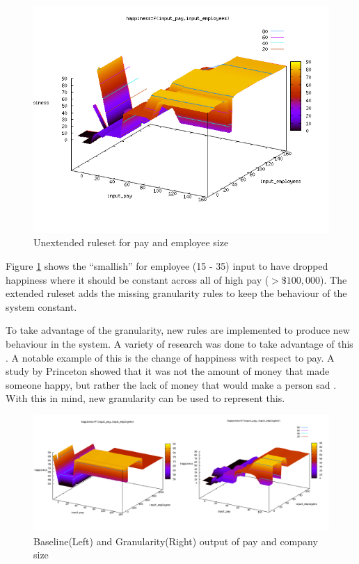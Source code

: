 \documentclass[12pt,fleqn,reqno,letterpaper]{article}
\begin{document}
\begin{figure}[H]
  \centering
  \includegraphics[scale=0.5,natwidth=650,natheight=501]{fig/extend_gran.png}
  \caption{Unextended ruleset for pay and employee size}
  \label{fig:EXTEND-GRAN}
\end{figure}
Figure \ref{fig:EXTEND-GRAN} shows the “smallish” for employee (15 - 35) input to have dropped happiness where it should be constant across all of high pay ($>\$100,000$).  The extended ruleset adds the missing granularity rules to keep the behaviour of the system constant.

To take advantage of the granularity, new rules are implemented to produce new behaviour in the system.  A variety of research was done to take advantage of this \cite{GRAN-2}.  A notable example of this is the change of happiness with respect to pay.  A study by Princeton showed that it was not the amount of money that made someone happy, but rather the lack of money that would make a person sad \cite{GRAN-1}.  With this in mind, new granularity can be used to represent this.

\begin{figure}[H]
  \centering
  \includegraphics[scale=0.5,natwidth=650,natheight=501]{fig/new_gran_rule.png}
  \caption{Baseline(Left) and Granularity(Right) output of pay and company size}
  \label{fig:NEW-GRAN-RULE}
\end{figure}
\end{document}
